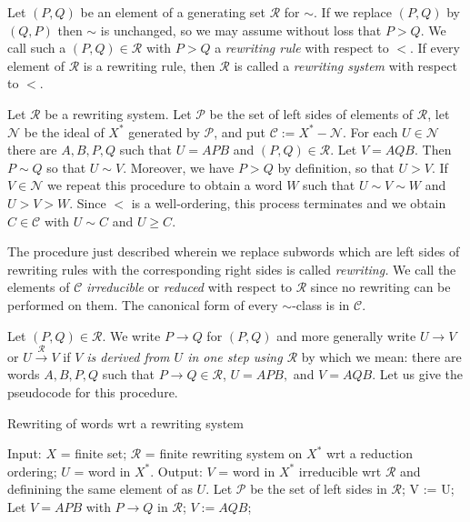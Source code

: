 \begin{ap} Let $(P,Q)$ be an element of a generating set $\mathcal{R}$ for
    $\sim$. If we replace $(P,Q)$ by $(Q,P)$ then $\sim$ is unchanged, so we
    may assume without loss that $P>Q$. We call such a $(P,Q)\in \mathcal{R}$
    with $P > Q$ a \emph{rewriting rule} with respect to $<$. If every element
    of $\mathcal{R}$ is a rewriting rule, then $\mathcal{R}$ is called a
    \emph{rewriting system} with respect to $<$.

    Let $\mathcal{R}$ be a rewriting system. Let $\mathcal{P}$ be the set of
    left sides of elements of $\mathcal{R}$, let $\mathcal{N}$ be the ideal of
    $X^*$ generated by $\mathcal{P}$, and put $\mathcal{C} := X^*-\mathcal{N}$.
    For each $U\in \mathcal{N}$ there are $A,B,P,Q$ such that $U=APB$ and
    $(P,Q)\in \mathcal{R}$. Let $V=AQB$. Then $P\sim Q$ so that $U\sim V$.
    Moreover, we have $P>Q$ by definition, so that $U > V$. If $V\in
    \mathcal{N}$ we repeat this procedure to obtain a word $W$ such that $U\sim
    V\sim W$ and $U > V > W.$ Since $<$ is a well-ordering, this process
    terminates and we obtain $C\in \mathcal{C}$ with $U\sim C$ and $U \ge C$.

    The procedure just described wherein we replace subwords which are left
    sides of rewriting rules with the corresponding right sides is called
    \emph{rewriting.} We call the elements of $\mathcal{C}$ \emph{irreducible}
    or \emph{reduced} with respect to $\mathcal{R}$ since no rewriting can be
    performed on them. The canonical form of every $\sim$-class is in
    $\mathcal{C}$.

    Let $(P,Q)\in \mathcal{R}$. We write $P\rightarrow Q$ for $(P,Q)$ and more
    generally write $U \rightarrow V$ or $U\xrightarrow{\mathcal{R}} V$ if
    \emph{$V$ is derived from $U$ in one step using $\mathcal{R}$} by which we
    mean: there are words $A,B,P,Q$ such that $P\rightarrow Q \in \mathcal{R}$,
    $U=APB,$ and $V = AQB.$ Let us give the pseudocode for this procedure.

\begin{algorithm}
\caption{Rewriting of words wrt a rewriting system}
\begin{algorithmic}[1]
    \State Input:
    \State $X$ = finite set;
    \State $\mathcal{R}$ = finite rewriting system on $X^*$ wrt a reduction ordering;
    \State $U$ = word in $X^*$.
    \State Output:
    \State $V$ = word in $X^*$ irreducible wrt $\mathcal{R}$
    \State \;\;\;\;\;\; and definining the same element of  as $U$.
    \State
    \State Let $\mathcal{P}$ be the set of left sides in $\mathcal{R}$;
    \State V := U;
    \State Let $V=APB$ with $P\rightarrow Q$ in $\mathcal{R}$;
    \State $V := AQB$;
    \EndWhile


\end{algorithmic}
\end{algorithm}
\end{ap}
